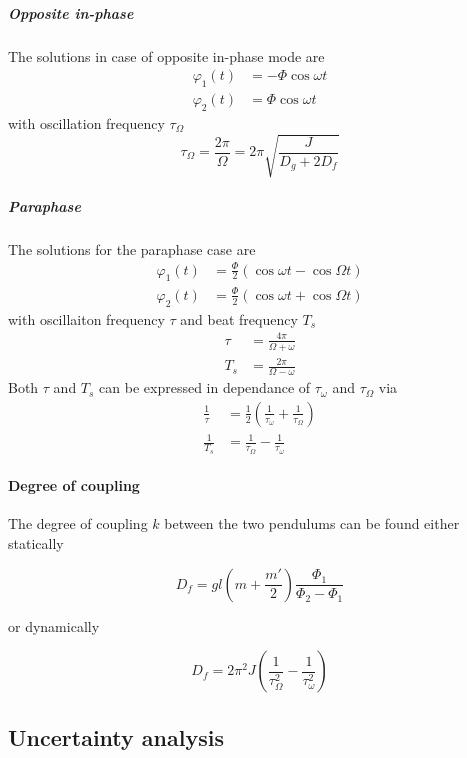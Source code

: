 \documentclass{scrreprt}
\renewcommand{\phi}{\varphi}
\begin{document}
\subparagraph*{Opposite in-phase}
The solutions in case of opposite in-phase mode are
\begin{align}
\phi_1(t) &= -\Phi \cos{\omega t}\\
\phi_2(t) &= \Phi \cos{\omega t}
\end{align}
with oscillation frequency $\tau_{\Omega}$
\begin{equation}
\tau_{\Omega} = \frac{2 \pi}{\Omega} = 2 \pi \sqrt{\frac{J}{D_g+2 D_f}}
\end{equation}

\subparagraph*{Paraphase}
The solutions for the paraphase case are
\begin{align}
\phi_1(t) &= \frac{\Phi}{2}\left(\cos{\omega t} - \cos{\Omega t}\right)\\
\phi_2(t) &= \frac{\Phi}{2}\left(\cos{\omega t} + \cos{\Omega t}\right)
\end{align}
with oscillaiton frequency $\tau$ and beat frequency $T_s$
\begin{align}
\tau &= \frac{4 \pi}{\Omega + \omega}\\
T_s &= \frac{2 \pi}{\Omega -\omega}
\end{align}
Both $\tau$ and $T_s$ can be expressed in dependance of $\tau_{\omega}$ and $\tau_{\Omega}$ via
\begin{align}
\frac{1}{\tau} &= \frac{1}{2}\left( \frac{1}{\tau_{\omega}} + \frac{1}{\tau_{\Omega}} \right)\\
\frac{1}{T_s} &= \frac{1}{\tau_{\Omega}} - \frac{1}{\tau_{\omega}}
\end{align}

\paragraph*{Degree of coupling}
The degree of coupling $k$ between the two pendulums can be found either statically

\begin{equation}
D_f = g l \left( m+ \frac{m'}{2} \right) \frac{\Phi_1}{\Phi_2 -\Phi_1}
\end{equation}

or dynamically

\begin{equation}
D_f = 2 \pi^2 J \left( \frac{1}{\tau_{\Omega}^2} - \frac{1}{\tau_{\omega}^2}  \right) 
\end{equation}

\subsection{Uncertainty analysis}
\end{document}
